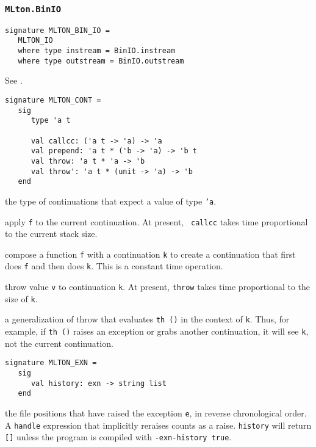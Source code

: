 \subsubsection{{\tt MLton.BinIO}}
\begin{verbatim}
signature MLTON_BIN_IO =
   MLTON_IO
   where type instream = BinIO.instream
   where type outstream = BinIO.outstream
\end{verbatim}

See .


\begin{verbatim}
signature MLTON_CONT =
   sig
      type 'a t

      val callcc: ('a t -> 'a) -> 'a
      val prepend: 'a t * ('b -> 'a) -> 'b t
      val throw: 'a t * 'a -> 'b
      val throw': 'a t * (unit -> 'a) -> 'b
   end
\end{verbatim}

\begin{description}

the type of continuations that expect a value of type {\tt 'a}.

apply {\tt f} to the current continuation.  At present, {\tt
callcc} takes time proportional to the current stack size.

compose a function {\tt f} with a continuation {\tt k} to create a
continuation that first does {\tt f} and then does {\tt k}.  This
is a constant time operation.

throw value {\tt v} to continuation {\tt k}.  At present, {\tt throw}
takes time proportional to the size of {\tt k}.

a generalization of throw that evaluates {\tt th ()} in the context
of {\tt k}.  Thus, for example, if {\tt th ()} raises an exception or
grabs another continuation, it will see {\tt k}, not the current
continuation.

\end{description}

\begin{verbatim}
signature MLTON_EXN =
   sig
      val history: exn -> string list
   end
\end{verbatim}

\begin{description}

the file positions that have raised the exception {\tt e}, in reverse
chronological order.   A {\tt handle} expression that implicitly reraises counts
as a raise.  {\tt history} will return {\tt []} unless the program is compiled
with {\tt -exn-history true}.

\end{description}

